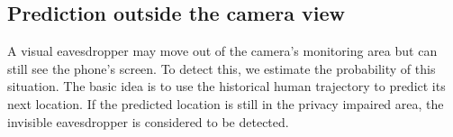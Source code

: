 



\subsection{Prediction outside the camera view}
A visual eavesdropper may move out of the camera's monitoring area but can still see  the phone's screen.
To detect this,  we estimate the probability of this situation. The basic idea  is to use the historical human trajectory to predict its next  location. If the predicted location is still in the privacy impaired area, the invisible eavesdropper is considered to be detected.

